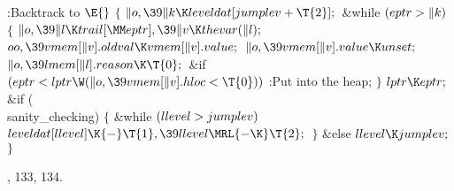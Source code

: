 \B{}:Backtrack to \X${}\E{}$\6
${}\{{}$\1\6
${}\|o,\39\|k\K\\{leveldat}[\\{jumplev}+\T{2}];{}$\6
\&{while} ${}(\\{eptr}>\|k){}$\5
${}\{{}$\1\6
${}\|o,\39\|l\K\\{trail}[\MM\\{eptr}],\39\|v\K\\{thevar}(\|l);{}$\6
${}\\{oo},\39\\{vmem}[\|v].\\{oldval}\K\\{vmem}[\|v].\\{value};{}$\6
${}\|o,\39\\{vmem}[\|v].\\{value}\K\\{unset};{}$\6
${}\|o,\39\\{lmem}[\|l].\\{reason}\K\T{0};{}$\6
\&{if} ${}(\\{eptr}<\\{lptr}\W(\|o,\39\\{vmem}[\|v].\\{hloc}<\T{0})){}$\1\5
:Put  into the heap\X;\2\6
\4${}\}{}$\2\6
${}\\{lptr}\K\\{eptr};{}$\6
\&{if} (\\{sanity\_checking})\5
${}\{{}$\1\6
\&{while} ${}(\\{llevel}>\\{jumplev}){}$\1\5
${}\\{leveldat}[\\{llevel}]\K{-}\T{1},\39\\{llevel}\MRL{-{\K}}\T{2};{}$\2\6
\4${}\}{}$\5
\2\&{else}\1\5
${}\\{llevel}\K\\{jumplev};{}$\2\6
\4${}\}{}$\2\par
{}, 133, 134.\fi

